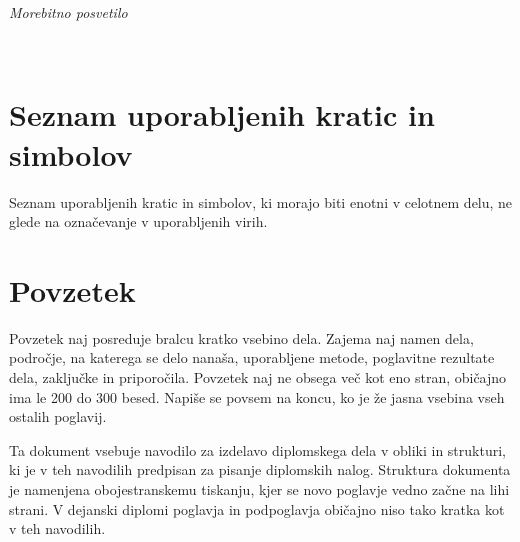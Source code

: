 \documentclass[12pt,a4paper,openany]{book}
\begin{document}
$\;$ 

\vspace{5cm}
\hfill {\Large \em Morebitno posvetilo}
\thispagestyle{empty}

\newpage



\ \thispagestyle{empty}

\newpage


\renewcommand\thepage{} 
\tableofcontents 
\renewcommand\thepage{\arabic{page}}

\thispagestyle{empty}



\chapter*{Seznam uporabljenih kratic in simbolov}

\thispagestyle{empty}

Seznam uporabljenih kratic in simbolov, ki morajo biti enotni v celotnem delu, ne glede na označevanje v uporabljenih virih.


\clearpage{\pagestyle{empty}\cleardoublepage}


\setcounter{page}{1}

\chapter*{Povzetek}


Povzetek naj posreduje bralcu kratko vsebino dela. Zajema naj namen dela, področje, na katerega se delo nanaša,
uporabljene metode, poglavitne rezultate dela, zaključke in priporočila. 
Povzetek naj ne obsega več kot eno stran, obi\v cajno ima le 200 do 300 besed. Napiše se povsem na koncu,
ko je že jasna vsebina vseh ostalih poglavij.

Ta dokument vsebuje navodilo za izdelavo diplomskega dela v obliki in strukturi, ki je v teh navodilih predpisan za
pisanje diplomskih nalog. Struktura dokumenta je namenjena obojestranskemu tiskanju, kjer se novo poglavje vedno za\v cne na lihi strani.
V dejanski diplomi poglavja in podpogla\-vja  obi\v cajno niso tako kratka kot v teh navodilih.
\end{document}
